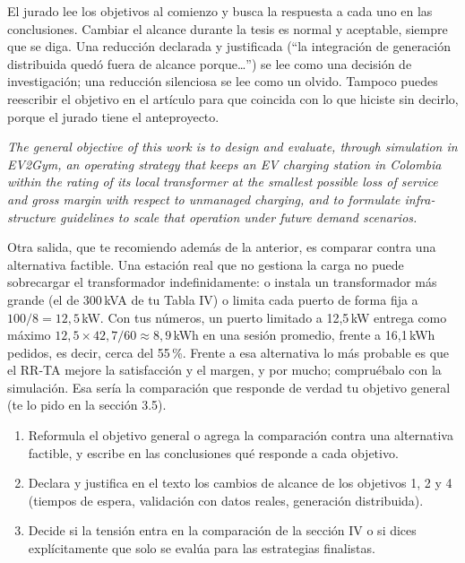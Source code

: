 \documentclass[11pt]{article}
\newenvironment{eng}{\begin{otherlanguage}{english}\itshape}{\end{otherlanguage}}
\begin{document}
\begin{idea}
El jurado lee los objetivos al comienzo y busca la respuesta a cada uno en las conclusiones. Cambiar el alcance durante la tesis es normal y aceptable, siempre que se diga. Una reducción declarada y justificada (``la integración de generación distribuida quedó fuera de alcance porque\ldots'') se lee como una decisión de investigación; una reducción silenciosa se lee como un olvido. Tampoco puedes reescribir el objetivo en el artículo para que coincida con lo que hiciste sin decirlo, porque el jurado tiene el anteproyecto.
\end{idea}

\begin{ejemplo}
\begin{eng}
The general objective of this work is to design and evaluate, through simulation in EV2Gym, an operating strategy that keeps an EV charging station in Colombia within the rating of its local transformer at the smallest possible loss of service and gross margin with respect to unmanaged charging, and to formulate infrastructure guidelines to scale that operation under future demand scenarios.
\end{eng}

\smallskip
Otra salida, que te recomiendo además de la anterior, es comparar contra una alternativa factible. Una estación real que no gestiona la carga no puede sobrecargar el transformador indefinidamente: o instala un transformador más grande (el de 300\,kVA de tu Tabla IV) o limita cada puerto de forma fija a $100/8 = 12{,}5$\,kW. Con tus números, un puerto limitado a 12,5\,kW entrega como máximo $12{,}5 \times 42{,}7/60 \approx 8{,}9$\,kWh en una sesión promedio, frente a 16,1\,kWh pedidos, es decir, cerca del 55\,\%. Frente a esa alternativa lo más probable es que el RR-TA mejore la satisfacción y el margen, y por mucho; compruébalo con la simulación. Esa sería la comparación que responde de verdad tu objetivo general (te lo pido en la sección 3.5).
\end{ejemplo}

\begin{tarea}
\begin{enumerate}
\item Reformula el objetivo general o agrega la comparación contra una alternativa factible, y escribe en las conclusiones qué responde a cada objetivo.
\item Declara y justifica en el texto los cambios de alcance de los objetivos 1, 2 y 4 (tiempos de espera, validación con datos reales, generación distribuida).
\item Decide si la tensión entra en la comparación de la sección IV o si dices explícitamente que solo se evalúa para las estrategias finalistas.
\end{enumerate}
\end{tarea}
\end{document}
